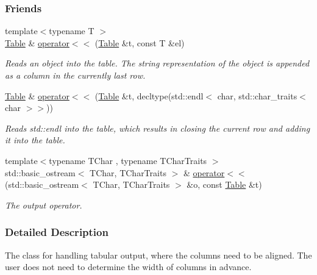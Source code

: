 \subsubsection*{Friends}
\begin{DoxyCompactItemize}
\item 
{\footnotesize template$<$typename T $>$ }\\\hyperlink{structslb_1_1core_1_1util_1_1Table}{Table} \& \hyperlink{structslb_1_1core_1_1util_1_1Table_ab2f038ef958603508282d43087ec366c}{operator$<$$<$} (\hyperlink{structslb_1_1core_1_1util_1_1Table}{Table} \&t, const T \&el)
\begin{DoxyCompactList}\small\item\em Reads an object into the table. The string representation of the object is appended as a column in the currently last row. \end{DoxyCompactList}\item 
\hyperlink{structslb_1_1core_1_1util_1_1Table}{Table} \& \hyperlink{structslb_1_1core_1_1util_1_1Table_a7f0695198091818a2d1568f63270c998}{operator$<$$<$} (\hyperlink{structslb_1_1core_1_1util_1_1Table}{Table} \&t, decltype(std\+::endl$<$ char, std\+::char\+\_\+traits$<$ char $>$$>$))
\begin{DoxyCompactList}\small\item\em Reads {\ttfamily std\+::endl} into the table, which results in closing the current row and adding it into the table. \end{DoxyCompactList}\item 
{\footnotesize template$<$typename T\+Char , typename T\+Char\+Traits $>$ }\\std\+::basic\+\_\+ostream$<$ T\+Char, T\+Char\+Traits $>$ \& \hyperlink{structslb_1_1core_1_1util_1_1Table_af7fb0a93919213bbe6101d2c8de706e3}{operator$<$$<$} (std\+::basic\+\_\+ostream$<$ T\+Char, T\+Char\+Traits $>$ \&o, const \hyperlink{structslb_1_1core_1_1util_1_1Table}{Table} \&t)
\begin{DoxyCompactList}\small\item\em The output operator. \end{DoxyCompactList}\end{DoxyCompactItemize}


\subsubsection{Detailed Description}
The class for handling tabular output, where the columns need to be aligned. The user does not need to determine the width of columns in advance. 

